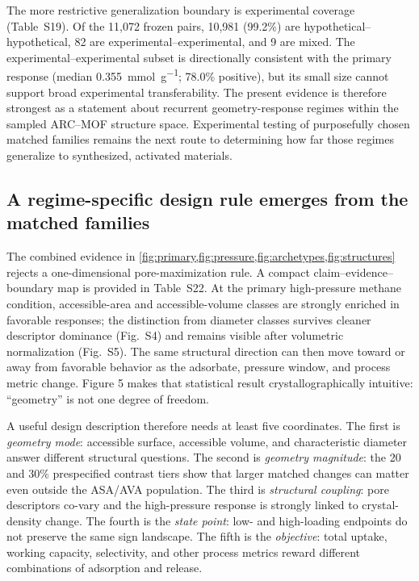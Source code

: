 \documentclass[11pt,a4paper]{article}
\newcommand{\SIfig}[1]{Fig.~S#1}
\newcommand{\SItab}[1]{Table~S#1}
\begin{document}
The more restrictive generalization boundary is experimental coverage
(\SItab{19}). Of the 11,072 frozen pairs, 10,981 (99.2\%) are
hypothetical--hypothetical, 82 are experimental--experimental, and 9 are mixed.
The experimental--experimental subset is directionally consistent with the
primary response (median \SI{0.355}{\milli\mole\per\gram}; 78.0\% positive), but
its small size cannot support broad experimental transferability. The present
evidence is therefore strongest as a statement about recurrent geometry-response
regimes within the sampled ARC--MOF structure space. Experimental testing of
purposefully chosen matched families remains the next route to determining how
far those regimes generalize to synthesized, activated materials.


\subsection{A regime-specific design rule emerges from the matched families}

The combined evidence in
\cref{fig:primary,fig:pressure,fig:archetypes,fig:structures} rejects a
one-dimensional pore-maximization rule. A compact claim--evidence--boundary map is
provided in \SItab{22}. At the primary high-pressure methane
condition, accessible-area and accessible-volume classes are strongly enriched in
favorable responses; the distinction from diameter classes survives cleaner
descriptor dominance (\SIfig{4}) and remains visible after volumetric normalization
(\SIfig{5}). The same structural direction can then move toward or away from
favorable behavior as the adsorbate, pressure window, and process metric change.
Figure 5 makes that statistical result crystallographically intuitive: ``geometry''
is not one degree of freedom.

A useful design description therefore needs at least five coordinates. The first is
\emph{geometry mode}: accessible surface, accessible volume, and characteristic
diameter answer different structural questions. The second is \emph{geometry
magnitude}: the 20 and 30\% prespecified contrast tiers show that larger matched
changes can matter even outside the ASA/AVA population. The third is
\emph{structural coupling}: pore descriptors co-vary and the high-pressure response
is strongly linked to crystal-density change. The fourth is the \emph{state point}:
low- and high-loading endpoints do not preserve the same sign landscape. The fifth
is the \emph{objective}: total uptake, working capacity, selectivity, and other
process metrics reward different combinations of adsorption and release.
\end{document}
